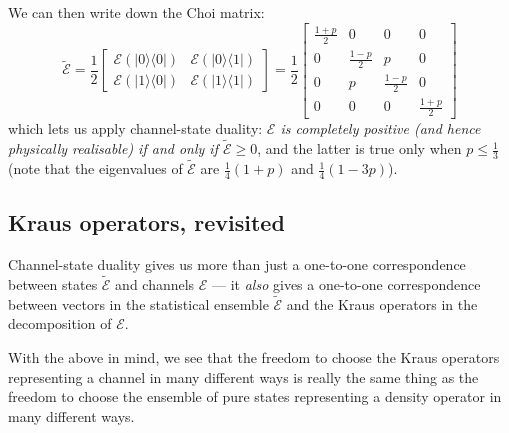 \documentclass[fleqn,a4paper]{article}
\newenvironment{idea}{\everypar{\setlength{\parindent}{1.5em}}}{}
\theoremstyle{definition}
\theoremstyle{definition}
\theoremstyle{definition}
\theoremstyle{definition}
\theoremstyle{remark}
\begin{document}
We can then write down the Choi matrix:
\[
  \widetilde{\mathcal{E}}
  = \frac{1}{2}
  \begin{bmatrix}
    \mathcal{E}(|0\rangle\langle 0|)
    & \mathcal{E}(|0\rangle\langle 1|)
  \\\mathcal{E}(|1\rangle\langle 0|)
    & \mathcal{E}(|1\rangle\langle 1|)
  \end{bmatrix}
  = \frac{1}{2}
  \left[
    \begin{array}{cc|cc}
    \frac{1+p}{2} & 0 & 0 & 0
  \\0 & \frac{1-p}{2} & p & 0
  \\\hline
    0 & p & \frac{1-p}{2} & 0
  \\0 & 0 & 0 & \frac{1+p}{2}
   \end{array}
  \right]
\]
which lets us apply channel-state duality: \emph{\(\mathcal{E}\) is completely positive (and hence physically realisable) if and only if \(\widetilde{\mathcal{E}}\geqslant 0\)}, and the latter is true only when \(p\leqslant\frac13\) (note that the eigenvalues of \(\widetilde{\mathcal{E}}\) are \(\frac{1}{4}(1+p)\) and \(\frac{1}{4}(1-3p)\)).

\hypertarget{kraus-operators-revisited}{%
\subsection{Kraus operators, revisited}\label{kraus-operators-revisited}}

\begin{idea}
Channel-state duality gives us more than just a one-to-one correspondence between states \(\widetilde{\mathcal{E}}\) and channels \(\mathcal{E}\) --- it \emph{also} gives a one-to-one correspondence between vectors in the statistical ensemble \(\widetilde{\mathcal{E}}\) and the Kraus operators in the decomposition of \(\mathcal{E}\).

\end{idea}

With the above in mind, we see that the freedom to choose the Kraus operators representing a channel in many different ways is really the same thing as the freedom to choose the ensemble of pure states representing a density operator in many different ways.
\end{document}
